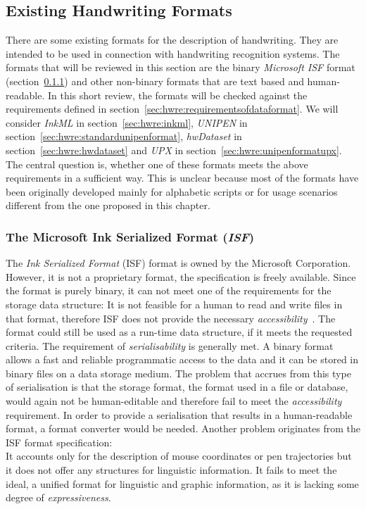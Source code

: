 

\subsection{Existing Handwriting Formats}
\label{sec:hwre:existingformats}

There are some existing formats for the description of handwriting.
They are intended to be used in connection with handwriting recognition systems.
The formats that will be reviewed in this section are the 
binary \emph{Microsoft ISF} format (section~\ref{sec:hwre:msisfformat})
and other non-binary formats that are text based and human-readable.
In this short review, the formats will be checked against the 
requirements defined in section~\ref{sec:hwre:requirementsofdataformat}. 
We will consider 
\emph{InkML} in section~\ref{sec:hwre:inkml}, 
\emph{UNIPEN} in section~\ref{sec:hwre:standardunipenformat}, 
\emph{hwDataset} in section~\ref{sec:hwre:hwdataset} and 
\emph{UPX} in section~\ref{sec:hwre:unipenformatupx}.
The central question is, whether one of these formats meets the above requirements in 
a sufficient way. This is unclear because most of the formats have been 
originally developed mainly for alphabetic scripts or for usage scenarios 
different from the one proposed in this chapter.

\subsubsection{The Microsoft Ink Serialized Format (\emph{ISF})}
\label{sec:hwre:msisfformat}

The \emph{Ink Serialized Format} (ISF) format is owned by the 
Microsoft Corporation. However, it is not a proprietary format, the 
specification is freely available. Since the format is purely binary, 
it can not meet one of the requirements for the storage data structure:
It is not feasible for a human to read and write files in that format,
therefore ISF does not provide the necessary 
\emph{accessibility}~. The format could still be used 
as a run-time data structure, if it meets the requested criteria.
The requirement of \emph{serialisability} is generally met. A binary format 
allows a fast and reliable programmatic access to the data and it can be stored
in binary files on a data storage medium. The problem that accrues from this 
type of serialisation is that the storage format, the format used in a file or 
database, would again not be human-editable and therefore fail to meet the 
\emph{accessibility} requirement.
In order to provide a serialisation that results in a human-readable format, 
a format converter would be needed. Another problem originates from the 
ISF format specification: \\
It accounts only for the description of mouse coordinates or pen trajectories 
but it does not offer any structures for linguistic information.
It fails to meet the ideal, a unified format for linguistic and graphic 
information, as it is lacking some degree of \emph{expressiveness}.

